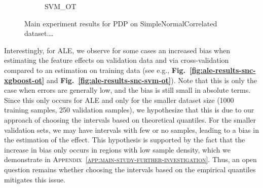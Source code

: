 \documentclass[runningheads]{llncs}
\begin{document}
\begin{figure}[htbp]
\begin{subfigure}[b]{0.49\textwidth}
        \caption{SVM\_OT}
        \label{fig:pdp-results-snc-svm-ot}  %
    \end{subfigure}
    \caption{Main experiment results for PDP on SimpleNormalCorrelated dataset.\dots}
    \label{fig:pdp-results-snc}  %
\end{figure}

Interestingly, for ALE, we observe for some cases an increased bias when
estimating the feature effects on validation data and via cross-validation
compared to an estimation on training data (see e.g.,
\textbf{Fig.\@~\ref{fig:ale-results-snc-xgboost-ot}} and
\textbf{Fig.\@~\ref{fig:ale-results-snc-svm-ot}}). Note that this is only the
case when errors are generally low, and the bias is still small in absolute
terms. Since this only occurs for ALE and only for the smaller dataset size
(1000 training samples, 250 validation samples), we hypothesize that this is
due to our approach of choosing the intervals based on theoretical quantiles.
For the smaller validation sets, we may have intervals with few or no samples,
leading to a bias in the estimation of the effect. This hypothesis is supported
by the fact that the increase in bias only occurs in regions with low sample
density, which we demonstrate in
\textsc{Appendix~\ref{app:main-study-further-investigation}}. Thus, an open
question remains whether choosing the intervals based on the empirical
quantiles mitigates this issue.
\end{document}
